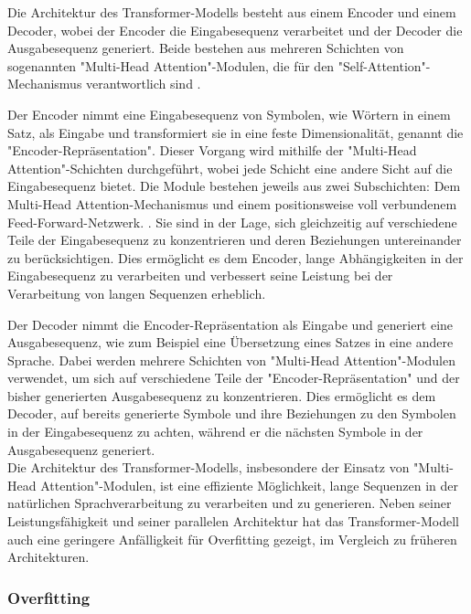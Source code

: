 \documentclass[oneside,bibliography=totocnumbered,BCOR=5mm]{scrbook}%
\theoremstyle{definition}
\theoremstyle{definition}
\theoremstyle{definition}
\theoremstyle{definition}
\theoremstyle{definition}
\theoremstyle{definition}
\begin{document}
Die Architektur des Transformer-Modells besteht aus einem Encoder und einem Decoder, 
wobei der Encoder die Eingabesequenz verarbeitet und der Decoder die Ausgabesequenz generiert. 
Beide bestehen aus mehreren Schichten von sogenannten "Multi-Head Attention"-Modulen, die für den "Self-Attention"-Mechanismus verantwortlich sind \autocite[Seite 3]{transformer}. 


Der Encoder nimmt eine Eingabesequenz von Symbolen, wie Wörtern in einem Satz, 
als Eingabe und transformiert sie in eine feste Dimensionalität, genannt die "Encoder-Repräsentation". 
Dieser Vorgang wird mithilfe der "Multi-Head Attention"-Schichten durchgeführt, wobei jede Schicht eine andere Sicht auf die Eingabesequenz bietet. 
Die Module bestehen jeweils aus zwei Subschichten: Dem Multi-Head Attention-Mechanismus und einem positionsweise voll verbundenem Feed-Forward-Netzwerk. \autocite[Seite 3]{transformer}.
Sie sind in der Lage, sich gleichzeitig auf verschiedene Teile der Eingabesequenz zu konzentrieren und deren Beziehungen untereinander zu berücksichtigen. 
Dies ermöglicht es dem Encoder, lange Abhängigkeiten in der Eingabesequenz zu verarbeiten und verbessert seine Leistung bei der Verarbeitung von langen Sequenzen erheblich. 


Der Decoder nimmt die Encoder-Repräsentation als Eingabe und generiert eine Ausgabesequenz, wie zum Beispiel eine Übersetzung eines Satzes in eine andere Sprache. 
Dabei werden mehrere Schichten von "Multi-Head Attention"-Modulen verwendet, um sich auf verschiedene Teile der "Encoder-Repräsentation" und der bisher generierten Ausgabesequenz zu konzentrieren. 
Dies ermöglicht es dem Decoder, auf bereits generierte Symbole und ihre Beziehungen zu den Symbolen in der Eingabesequenz zu achten, während er die nächsten Symbole in der Ausgabesequenz generiert. \\


Die Architektur des Transformer-Modells, insbesondere der Einsatz von "Multi-Head Attention"-Modulen, ist eine effiziente Möglichkeit, 
lange Sequenzen in der natürlichen Sprachverarbeitung zu verarbeiten und zu generieren. 
Neben seiner Leistungsfähigkeit und seiner parallelen Architektur hat das 
Transformer-Modell auch eine geringere Anfälligkeit für Overfitting gezeigt, 
im Vergleich zu früheren Architekturen. \\



\subsubsection{Overfitting}
\end{document}
